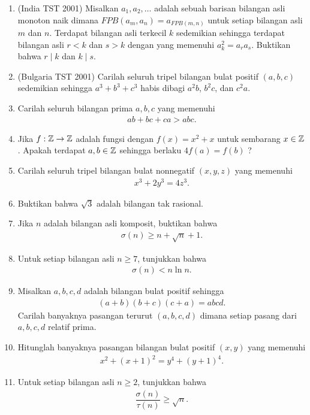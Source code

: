 \documentclass[12pt]{scrartcl}
\begin{document}
\begin{enumerate}
    \item (India TST 2001) Misalkan $a_1,a_2,\dots$ adalah sebuah barisan bilangan asli monoton naik dimana $FPB(a_m,a_n)=a_{FPB(m,n)}$ untuk setiap bilangan asli $m$ dan $n$. Terdapat bilangan asli terkecil $k$ sedemikian sehingga terdapat bilangan asli $r<k$ dan $s>k$ dengan yang memenuhi $a_k^2=a_ra_s$. Buktikan bahwa $r \mid k$ dan $k \mid s$.

    \item (Bulgaria TST 2001) Carilah seluruh tripel bilangan bulat positif $(a,b,c)$ sedemikian sehingga $a^3+b^3+c^3$ habis dibagi $a^2b$, $b^2c$, dan $c^2a$.

    \item Carilah seluruh bilangan prima $a,b,c$ yang memenuhi
    \begin{align*}
        ab+bc+ca > abc.
    \end{align*}
    
    \item Jika $f: \mathbb Z \to \mathbb Z$ adalah fungsi dengan $f(x)=x^2+x$ untuk sembarang $x \in \mathbb Z$. Apakah terdapat $a,b \in \mathbb Z$ sehingga berlaku $4f(a)=f(b)$ ?
    
    \item Carilah seluruh tripel bilangan bulat nonnegatif $(x,y,z)$ yang memenuhi
    \begin{align*}
        x^3+2y^3=4z^3.
    \end{align*}

    \item Buktikan bahwa $\sqrt{3}$ adalah bilangan tak rasional.
    
    \item Jika $n$ adalah bilangan asli komposit, buktikan bahwa
    \begin{align*}
        \sigma(n) \ge n + \sqrt{n} + 1.
    \end{align*}

    \item Untuk setiap bilangan asli $n \ge 7$, tunjukkan bahwa
    \begin{align*}
        \sigma(n) < n \ln n.
    \end{align*}

        \item Misalkan $a,b,c,d$ adalah bilangan bulat positif sehingga
    \begin{align*}
        (a+b)(b+c)(c+a) = abcd.
    \end{align*}
    Carilah banyaknya pasangan terurut $(a,b,c,d)$ dimana setiap pasang dari $a,b,c,d$ relatif prima.
    
    \item Hitunglah banyaknya pasangan bilangan bulat positif $(x,y)$ yang memenuhi
    \begin{align*}
        x^2+(x+1)^2 = y^4 + (y+1)^4.
    \end{align*}

    \item Untuk setiap bilangan asli $n \ge 2$, tunjukkan bahwa
    \begin{align*}
        \dfrac{\sigma(n)}{\tau(n)} \ge \sqrt{n}.
    \end{align*}
\end{enumerate}
\end{document}
